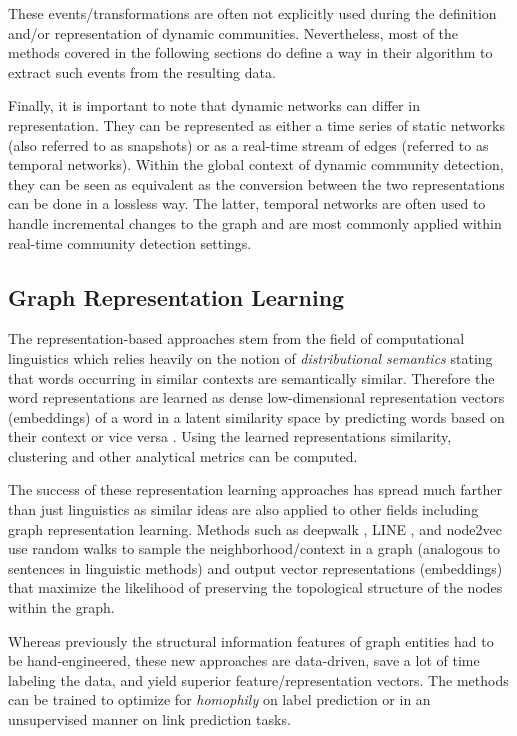 \documentclass[
acmsmall,
nonacm,
screen,
acmthm]{acmart}
\begin{document}
These events/transformations are often not explicitly used during the
definition and/or representation of dynamic communities. Nevertheless,
most of the methods covered in the following sections do define a way in
their algorithm to extract such events from the resulting data.

Finally, it is important to note that dynamic networks can differ in
representation. They can be represented as either a time series of
static networks (also referred to as snapshots) or as a real-time stream
of edges (referred to as temporal networks). Within the global context
of dynamic community detection, they can be seen as equivalent as the
conversion between the two representations can be done in a lossless
way. The latter, temporal networks are often used to handle incremental
changes to the graph and are most commonly applied within real-time
community detection settings.

\hypertarget{graph-representation-learning}{%
\subsection{Graph Representation
Learning}\label{graph-representation-learning}}

The representation-based approaches stem from the field of computational
linguistics which relies heavily on the notion of \emph{distributional
semantics} stating that words occurring in similar contexts are
semantically similar. Therefore the word representations are learned as
dense low-dimensional representation vectors (embeddings) of a word in a
latent similarity space by predicting words based on their context or
vice versa
\citep{mikolovEfficientEstimationWord2013, penningtonGloveGlobalVectors2014}.
Using the learned representations similarity, clustering and other
analytical metrics can be computed.

The success of these representation learning approaches has spread much
farther than just linguistics as similar ideas are also applied to other
fields including graph representation learning. Methods such as deepwalk
\citep{perozziDeepWalkOnlineLearning2014}, LINE
\citep{tangLINELargescaleInformation2015}, and node2vec
\citep{groverNode2vecScalableFeature2016} use random walks to sample the
neighborhood/context in a graph (analogous to sentences in linguistic
methods) and output vector representations (embeddings) that maximize
the likelihood of preserving the topological structure of the nodes
within the graph.

Whereas previously the structural information features of graph entities
had to be hand-engineered, these new approaches are data-driven, save a
lot of time labeling the data, and yield superior feature/representation
vectors. The methods can be trained to optimize for \emph{homophily} on
label prediction or in an unsupervised manner on link prediction tasks.
\end{document}
